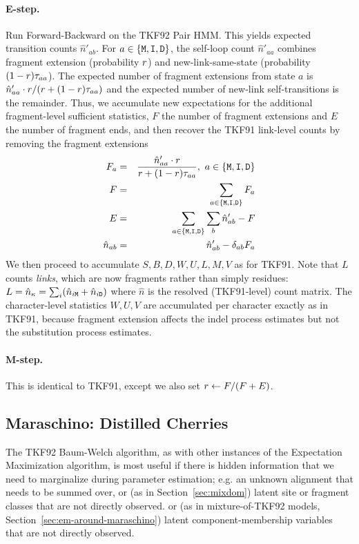 \paragraph{E-step.}
Run Forward-Backward on the TKF92 Pair HMM.
This yields expected transition counts $\hat{n}'_{ab}$.
For $a \in \{{\tt M},{\tt I},{\tt D}\}$, the self-loop count $\hat{n}'_{aa}$ combines
fragment extension (probability $r$) and new-link-same-state (probability $(1-r)\tau_{aa}$).
The expected number of fragment extensions from state $a$ is
$\hat{n}'_{aa} \cdot r / (r + (1-r)\tau_{aa})$
and the expected number of new-link self-transitions is the remainder.
Thus, we accumulate new expectations for the additional fragment-level sufficient statistics,
$F$ the number of fragment extensions and $E$ the number of fragment ends,
and then recover the TKF91 link-level counts by removing the fragment extensions
\begin{eqnarray*}
F_a & = & \frac{\hat{n}'_{aa} \cdot r}{r + (1-r)\tau_{aa}},\ a \in \{{\tt M},{\tt I},{\tt D}\} \\
F & = & \sum_{a \in \{{\tt M},{\tt I},{\tt D}\}} F_a \\
E & = & \sum_{a \in \{{\tt M},{\tt I},{\tt D}\}} \sum_b \hat{n}'_{ab} - F \\
\hat{n}_{ab} & = & \hat{n}'_{ab} - \delta_{ab} F_a
\end{eqnarray*}
We then proceed to accumulate $S, B, D, W, U, L, M, V$ as for TKF91.
Note that $L$ counts \emph{links}, which are now fragments rather than simply residues:
$L = \hat{n}_\kappa = \sum_{i} (\hat{n}_{i{\tt M}} + \hat{n}_{i{\tt D}})$
where $\hat{n}$ is the resolved (TKF91-level) count matrix.
The character-level statistics $W,U,V$ are accumulated per character exactly as in TKF91, because fragment extension affects the indel process estimates but not the substitution process estimates.

\paragraph{M-step.}
This is identical to TKF91, except we also set $r \leftarrow F / (F + E)$.

\subsection{Maraschino: Distilled Cherries}
\label{sec:maraschino-intro}

The TKF92 Baum-Welch algorithm, as with other instances of the Expectation Maximization algorithm,
is most useful if there is hidden information that we need to marginalize during parameter estimation;
e.g. an unknown alignment that needs to be summed over,
\ifdefined\MIXDOMPAPER
or (as in Section~\ref{sec:mixdom}) latent site or fragment classes that are not directly observed.
\else
or (as in mixture-of-TKF92 models, Section~\ref{sec:em-around-maraschino}) latent component-membership variables that are not directly observed.
\fi


